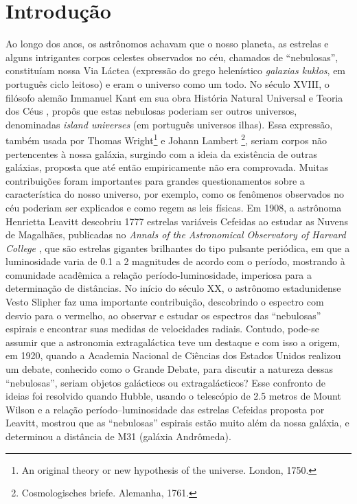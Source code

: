 \chapter{Introdução}

Ao longo dos anos, os astrônomos achavam que o nosso planeta, as estrelas e alguns intrigantes corpos celestes observados no céu, chamados de ``nebulosas'', constituíam nossa Via Láctea (expressão do grego helenístico \emph{galaxias kuklos}, em português ciclo leitoso) e eram o universo como um todo. No século XVIII, o filósofo alemão Immanuel Kant em sua obra História Natural Universal e Teoria dos Céus \cite{1755Kant}, propôs que estas nebulosas poderiam ser outros universos, denominadas \emph{island universes} (em português universos ilhas). Essa expressão, também usada por Thomas Wright\footnote{An original theory or new hypothesis of the universe. London, 1750.} e Johann Lambert \footnote{Cosmologisches briefe. Alemanha, 1761.}, seriam corpos não pertencentes à nossa galáxia, surgindo com a ideia da existência de outras galáxias, proposta que até então empiricamente não era comprovada. Muitas contribuições foram importantes para grandes questionamentos sobre a característica do nosso universo, por exemplo, como os fenômenos observados no céu poderiam ser explicados e como regem as leis físicas. Em 1908, a astrônoma Henrietta Leavitt descobriu 1777 estrelas variáveis Cefeidas ao estudar as Nuvens de Magalhães, publicadas no \emph{Annals of the Astronomical Observatory of Harvard College} \cite{1908Leavitt}, que são estrelas gigantes brilhantes do tipo pulsante periódica, em que a luminosidade varia de 0.1 a 2 magnitudes de acordo com o período, mostrando à comunidade acadêmica a relação período-luminosidade, imperiosa para a determinação de distâncias. No início do século XX, o astrônomo estadunidense Vesto Slipher faz uma importante contribuição, descobrindo o espectro com desvio para o vermelho, ao observar e estudar os espectros das ``nebulosas'' espirais e encontrar suas medidas de velocidades radiais. Contudo, pode-se assumir que a astronomia extragaláctica teve um destaque e com isso a origem, em 1920, quando a Academia Nacional de Ciências dos Estados Unidos realizou um debate, conhecido como o Grande Debate, para discutir a natureza dessas ``nebulosas'', seriam objetos galácticos ou extragalácticos? Esse confronto de ideias foi resolvido quando Hubble, usando o telescópio de 2.5 metros de Mount Wilson e a relação período–luminosidade das estrelas Cefeidas proposta por Leavitt, mostrou que as ``nebulosas'' espirais estão muito além da nossa galáxia, e determinou a distância de M31 (galáxia Andrômeda).

